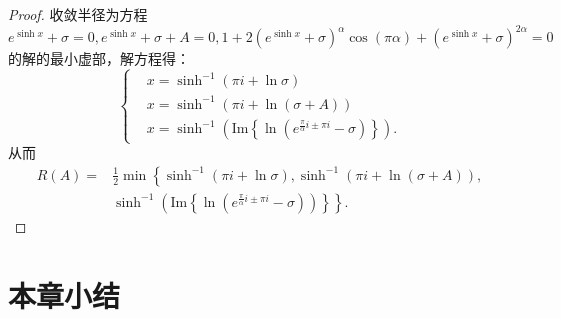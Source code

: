 \begin{proof}
	收敛半径为方程\(e^{\sinh x}+\sigma=0,e^{\sinh x}+\sigma+A=0,1+2(e^{\sinh x}+\sigma)^{\alpha}\cos(\pi \alpha)+(e^{\sinh x}+\sigma)^{2\alpha}=0\) 的解的最小虚部，解方程得：
	\begin{equation}
		\left\{
		\begin{aligned}
			&x=\sinh^{-1}(\pi i+\ln \sigma)\\
			&x=\sinh^{-1}(\pi i+\ln(\sigma+A) )\\
			&x=\sinh^{-1}\left(\text{Im}\left\{\ln\left(e^{\frac{\pi}{\alpha}i\pm \pi i}-\sigma\right)\right\}\right).
		\end{aligned}
		\right.
	\end{equation}
	从而
	\begin{equation}
		\begin{aligned}
			R(A)=&\frac{1}{2}\min\left\{
			\sinh^{-1}(\pi i+\ln \sigma),\sinh^{-1}(\pi i+\ln(\sigma+A) ),\right.\\
			&\left.\sinh^{-1}\left(\text{Im}\left\{\ln\left(e^{\frac{\pi}{\alpha}i\pm \pi i}-\sigma\right)\right)\right\}
			\right\}.
		\end{aligned}
	\end{equation}
\end{proof}






\section{本章小结}

